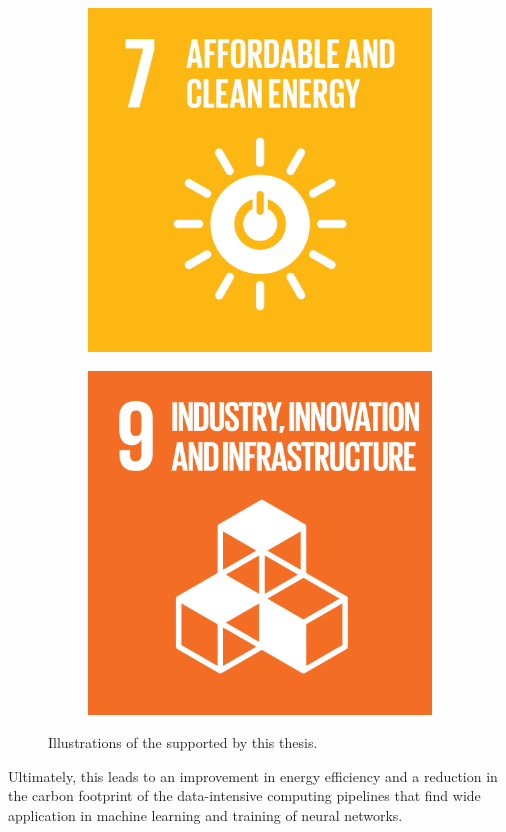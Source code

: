 \begin{figure}
    \centering
    \begin{subfigure}[b]{0.5\linewidth}
        \centering
        \includegraphics[width=0.6\linewidth]{figures/1-introduction/E_SDG_goals_icons-07.png} 
        \label{fig:sdg07}
    \end{subfigure}\hfill
    \begin{subfigure}[b]{0.5\linewidth}
        \centering
        \includegraphics[width=0.6\linewidth]{figures/1-introduction/E_SDG-goals_icons-09.png}
        \label{fig:sdg09}
	\end{subfigure}
	\caption[Sustainable Development Goals supported by this thesis]{Illustrations of the  supported by this thesis.}
	\label{fig:sdgs}
\end{figure}

Ultimately, this leads to an improvement in energy efficiency and a reduction in the carbon footprint of the data-intensive computing pipelines that find wide application in machine learning and training of neural networks.
